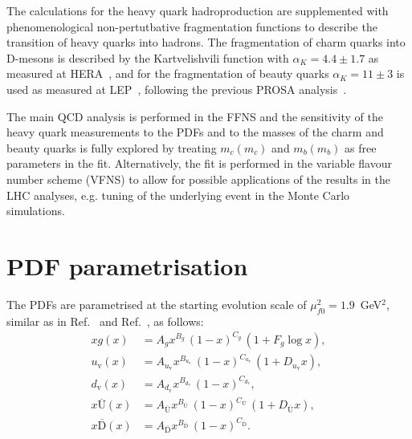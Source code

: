 \documentclass[12pt]{article}
\begin{document}
The calculations for the heavy quark hadroproduction are supplemented with phenomenological non-pertutbative fragmentation 
functions to describe the transition of heavy quarks into hadrons. The fragmentation of charm quarks into D-mesons is 
described by the Kartvelishvili function with $\alpha_K = 4.4 \pm 1.7$ as measured at HERA~\cite{Aaron:2008ac,Chekanov:2008ur}, 
and for the fragmentation of beauty quarks $\alpha_K = 11 \pm 3$ is used as measured at LEP~\cite{Nason:1999zj}, following 
the previous PROSA analysis~\cite{Zenaiev:2015rfa}.

The main QCD analysis is performed in the FFNS and the sensitivity of the heavy quark measurements to the PDFs and to the masses 
of the charm and beauty quarks is fully explored by treating $m_c(m_c)$ and $m_b(m_b)$ as free parameters in the fit.
Alternatively, the fit is performed in the variable flavour number scheme (VFNS) to allow for possible applications of the 
results in the LHC analyses, e.g. tuning of the underlying event in the Monte Carlo simulations.


\section{PDF parametrisation}
\label{sec:pdfparam}

The PDFs are parametrised at the starting evolution scale of $\mu^2_{f0} = 1.9$~GeV$^2$, similar as in Ref.~\cite{Abramowicz:2015mha} and Ref.~\cite{Bonvini:2019wxf}, as follows:
\begin{equation}\begin{aligned}
xg(x) &= A_{g} x^{B_{g}}\,(1-x)^{C_{g}}\, (1 + F_{g} {\log x}),\\
u_\mathrm{v}(x) &= A_{u_\mathrm{v}}x^{B_{u_\mathrm{v}}}\,(1-x)^{C_{u_\mathrm{v}}}\,(1+D_{u_\mathrm{v}}x) ,\\
d_\mathrm{v}(x) &= A_{d_\mathrm{v}}x^{B_{d_\mathrm{v}}}\,(1-x)^{C_{d_\mathrm{v}}},\\
x\overline{\mathrm{U}}(x)&= A_{\overline{\mathrm{U}}}x^{B_{\overline{\mathrm{U}}}}\, (1-x)^{C_{\overline{\mathrm{U}}}}\, (1+D_{\overline{\mathrm{U}}}x), \\
x\overline{\mathrm{D}}(x)&= A_{\overline{\mathrm{D}}}x^{B_{\overline{\mathrm{D}}}}\, (1-x)^{C_{\overline{\mathrm{D}}}}.
\end{aligned}
\label{eq:dv}
\end{equation}
\end{document}
